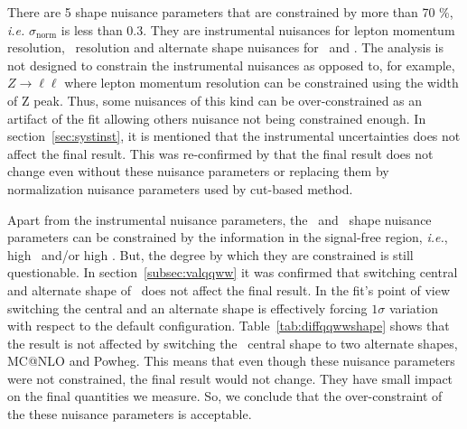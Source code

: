 There are 5 shape nuisance parameters that are constrained by more than 70 \%, 
\textit{i.e.} $\sigma_{\textrm{norm}}$ is less than 0.3. They are 
instrumental nuisances for lepton momentum resolution, \met\ resolution 
and alternate shape nuisances for \qqww\ and \topbkg.
The analysis is not designed to constrain the instrumental nuisances 
as opposed to, for example, $Z\to \ell\ell$ where lepton momentum resolution
can be constrained using the width of Z peak. 
Thus, some nuisances of this kind can be over-constrained 
as an artifact of the fit allowing others nuisance not being constrained enough. 
In section~\ref{sec:systinst}, it is mentioned that 
the instrumental uncertainties does not affect the final result.
This was re-confirmed by that the final result does not change 
even without these nuisance parameters or replacing them by normalization 
nuisance parameters used by cut-based method.  

Apart from the instrumental nuisance parameters, the \qqww\ and \topbkg\ shape 
nuisance parameters can be constrained by the information in the signal-free region, 
\textit{i.e.}, high \mT\ and/or high \mll. But, the degree by which they are 
constrained is still questionable. In section~\ref{subsec:valqqww} it was 
confirmed that switching central and alternate shape of \qqww\ does not 
affect the final result. In the fit's point of view switching the central and 
an alternate shape is effectively forcing $1\sigma$ variation 
with respect to the default configuration. Table~\ref{tab:diffqqwwshape} 
shows that the result is not affected by switching the \qqww\ central 
shape to two alternate shapes, MC@NLO and Powheg. 
This means that even though these nuisance parameters were not constrained,
the final result would not change. They have small impact on the final 
quantities we measure. So, we conclude that the over-constraint of the these 
nuisance parameters is acceptable.   
 

